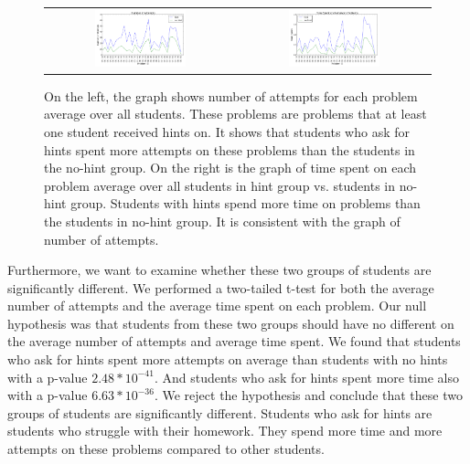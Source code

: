 \documentclass{llncs}
\begin{document}
\begin{figure}[ht]
\centering
   \begin{tabular}{c c}
		\includegraphics[width=0.5\textwidth]{image/tries_analysis.png} &
		\includegraphics[width=0.5\textwidth]{image/times_analysis.png}
	\end{tabular}
    \caption{On the left, the graph shows number of attempts for each problem average over all students. These problems are problems that at least one student received hints on. It shows that students who ask for hints spent more attempts on these problems than the students in the no-hint group. On the right is the graph of time spent on each problem average over all students in hint group vs. students in no-hint group. Students with hints spend more time on problems than the students in no-hint group. It is consistent with the graph of number of attempts.}
    \label{fig:tries_times_analysis}
\end{figure}

Furthermore, we want to examine whether these two groups of students are significantly different. We performed a two-tailed t-test for both the average number of attempts and the average time spent on each problem. Our null hypothesis was that students from these two groups should have no different on the average number of attempts and average time spent. We found that students who ask for hints spent more attempts on average than students with no hints with a p-value $2.48*10^{-41}$. And students who ask for hints spent more time also with a p-value $6.63*10^{-36}$. We reject the hypothesis and conclude that these two groups of students are significantly different. Students who ask for hints are students who struggle with their homework. They spend more time and more attempts on these problems compared to other students.
\end{document}
